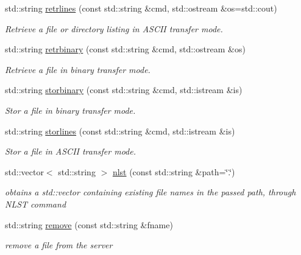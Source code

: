 \begin{CompactItemize}
std::string \hyperlink{classftplib_1_1FTP_b04e374d4835e124959cee085df3fa4e}{retrlines} (const std::string \&cmd, std::ostream \&os=std::cout)
\begin{CompactList}\small\item\em Retrieve a file or directory listing in ASCII transfer mode. \item\end{CompactList}\item 
std::string \hyperlink{classftplib_1_1FTP_ad060fdb45fec7ccd5949e475df96982}{retrbinary} (const std::string \&cmd, std::ostream \&os)
\begin{CompactList}\small\item\em Retrieve a file in binary transfer mode. \item\end{CompactList}\item 
std::string \hyperlink{classftplib_1_1FTP_37c828c7d98c7da3fe3b936526118416}{storbinary} (const std::string \&cmd, std::istream \&is)
\begin{CompactList}\small\item\em Stor a file in binary transfer mode. \item\end{CompactList}\item 
std::string \hyperlink{classftplib_1_1FTP_956c5fa0546d7a6a2db0b4dee28f6868}{storlines} (const std::string \&cmd, std::istream \&is)
\begin{CompactList}\small\item\em Stor a file in ASCII transfer mode. \item\end{CompactList}\item 
std::vector$<$ std::string $>$ \hyperlink{classftplib_1_1FTP_a793fa113ee6fc82e3db3b7ed769ff3f}{nlst} (const std::string \&path=\char`\"{}.\char`\"{})
\begin{CompactList}\small\item\em obtains a std::vector containing existing file names in the passed path, through NLST command \item\end{CompactList}\item 
std::string \hyperlink{classftplib_1_1FTP_00e0a674ee47139d6205cd95cef42e73}{remove} (const std::string \&fname)
\begin{CompactList}\small\item\em remove a file from the server \item\end{CompactList}\item 

\end{CompactItemize}

